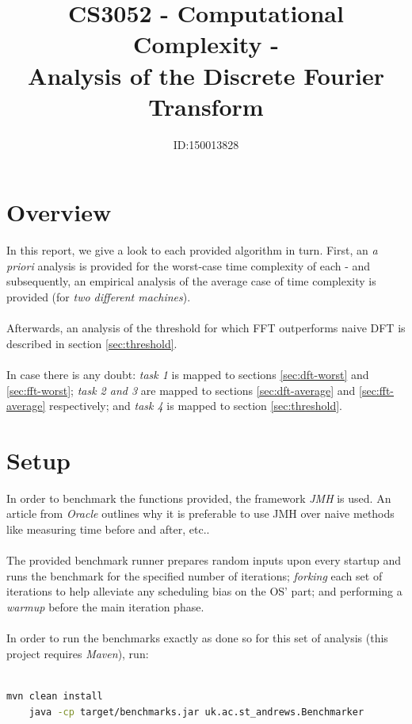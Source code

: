 \documentclass[]{article}
\title{CS3052 - Computational Complexity -\\Analysis of the Discrete Fourier Transform}
\author{ID:150013828}
\begin{document}
\maketitle

\section{Overview}
In this report, we give a look to each provided algorithm in turn. First, an \emph{a priori} analysis is provided for the worst-case time complexity of each - and subsequently, an empirical analysis of the average case of time complexity is provided (for \emph{two different machines}).
\\\\
Afterwards, an analysis of the threshold for which FFT outperforms naive DFT is described in section \ref{sec:threshold}.
\\\\
In case there is any doubt: \emph{task 1} is mapped to sections \ref{sec:dft-worst} and \ref{sec:fft-worst}; \emph{task 2 and 3} are mapped to sections \ref{sec:dft-average} and \ref{sec:fft-average} respectively; and \emph{task 4} is mapped to section \ref{sec:threshold}.

\section{Setup}
In order to benchmark the functions provided, the framework \emph{JMH}\cite{ref:jmh} is used. An article from \emph{Oracle}\cite{ref:oracle-benchmarking} outlines why it is preferable to use JMH over naive methods like measuring time before and after, etc..
\\\\
The provided benchmark runner prepares random inputs upon every startup and runs the benchmark for the specified number of iterations; \emph{forking} each set of iterations to help alleviate any scheduling bias on the OS' part; and performing a \emph{warmup} before the main iteration phase.
\\\\
In order to run the benchmarks exactly as done so for this set of analysis (this project requires \emph{Maven}), run:\\\\
\begin{minipage}[!h]{\linewidth}
	\begin{lstlisting}[frame=single,language=bash]
	mvn clean install
	java -cp target/benchmarks.jar uk.ac.st_andrews.Benchmarker
	\end{lstlisting}
\end{minipage}
\end{document}
